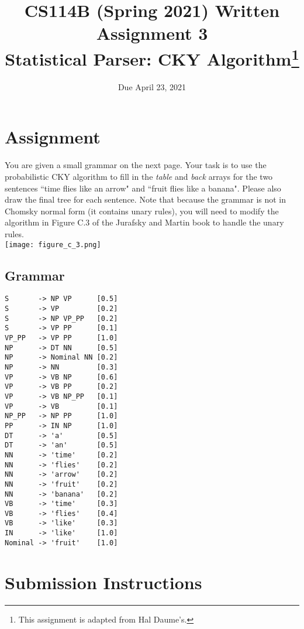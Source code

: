 \documentclass[11pt,letterpaper]{article}
\begin{document}
\title{CS114B (Spring 2021) Written Assignment 3 \\ Statistical Parser: CKY Algorithm\footnote{This assignment is adapted from Hal Daume's.}}
\author{Due April 23, 2021}
\date{}
\maketitle

\section*{Assignment}

You are given a small grammar on the next page. Your task is to use the probabilistic CKY algorithm to fill in the \textit{table} and \textit{back} arrays for the two sentences ``time flies like an arrow" and ``fruit flies like a banana". Please also draw the final tree for each sentence. Note that because the grammar is not in Chomsky normal form (it contains unary rules), you will need to modify the algorithm in Figure C.3 of the Jurafsky and Martin book to handle the unary rules.\\

\noindent\texttt{[image: figure\_c\_3.png]}

\subsection*{Grammar}

\begin{verbatim}
S       -> NP VP      [0.5]
S       -> VP         [0.2]
S       -> NP VP_PP   [0.2]
S       -> VP PP      [0.1]
VP_PP   -> VP PP      [1.0]
NP      -> DT NN      [0.5]
NP      -> Nominal NN [0.2]
NP      -> NN         [0.3]
VP      -> VB NP      [0.6]
VP      -> VB PP      [0.2]
VP      -> VB NP_PP   [0.1]
VP      -> VB         [0.1]
NP_PP   -> NP PP      [1.0]
PP      -> IN NP      [1.0]
DT      -> 'a'        [0.5]
DT      -> 'an'       [0.5]
NN      -> 'time'     [0.2]
NN      -> 'flies'    [0.2]
NN      -> 'arrow'    [0.2]
NN      -> 'fruit'    [0.2]
NN      -> 'banana'   [0.2]
VB      -> 'time'     [0.3]
VB      -> 'flies'    [0.4]
VB      -> 'like'     [0.3]
IN      -> 'like'     [1.0]
Nominal -> 'fruit'    [1.0]
\end{verbatim}\newpage

\section*{Submission Instructions}
\end{document}

